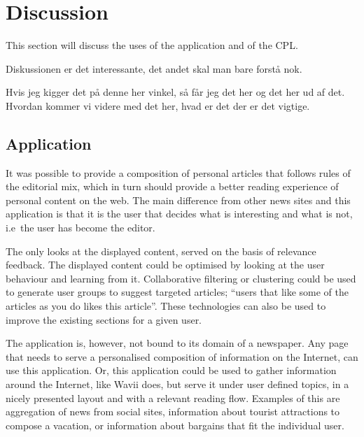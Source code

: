 \chapter{Discussion} %
\label{ch:discussion}
This section will discuss the uses of the application and of the CPL.

Diskussionen er det interessante, det andet skal man bare forstå nok.

Hvis jeg kigger det på denne her vinkel, så får jeg det her og det her ud af det.
Hvordan kommer vi videre med det her, hvad er det der er det vigtige.


\section{Application}
It was possible to provide a composition of personal articles that follows rules of the editorial mix, which in turn should provide a better reading experience of personal content on the web. The main difference from other news sites and this application is that it is the user that decides what is interesting and what is not, i.e\ the user has become the editor.

The only looks at the displayed content, served on the basis of relevance feedback. The displayed content could be optimised by looking at the user behaviour and learning from it. Collaborative filtering or clustering could be used to generate user groups to suggest targeted articles; ``users that like some of the articles as you do likes this article''. These technologies can also be used to improve the existing sections for a given user.

The application is, however, not bound to its domain of a newspaper. Any page that needs to serve a personalised composition of information on the Internet, can use this application. Or, this application could be used to gather information around the Internet, like Wavii does, but serve it under user defined topics, in a nicely presented layout and with a relevant reading flow. Examples of this are aggregation of news from social sites, information about tourist attractions to compose a vacation, or information about bargains that fit the individual user.

